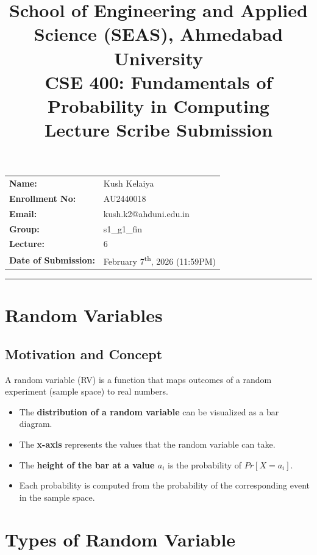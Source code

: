 \documentclass[11pt]{article}
\title{
	\normalsize School of Engineering and Applied Science (SEAS), Ahmedabad University \\
	\vspace{0.2cm}
	\textbf{CSE 400: Fundamentals of Probability in Computing}\\
	\Large Lecture Scribe Submission
}
\author{}
\date{}
\begin{document}
\maketitle

\vspace{-2cm}
\begin{center}
	\begin{tabular}{ll}
		\textbf{Name:} & {Kush Kelaiya \hspace{2.5in}} \\ [1.5ex]
		\textbf{Enrollment No:} & {AU2440018 \hspace{2.5in}} \\ [1.5ex]
		\textbf{Email:} & {kush.k2@ahduni.edu.in \hspace{2.1in}} \\ [1.5ex]
		\textbf{Group: } & s1\_g1\_fin \\ [1.5ex]
		\textbf{Lecture:} & 6 \\ [1.5ex]
		\textbf{Date of Submission:} & {February 7\textsuperscript{th}, 2026 (11:59PM) \hspace{1.2in}}
	\end{tabular}
\end{center}

\hrule
\vspace{0.5cm}

\section{Random Variables}
\subsection{Motivation and Concept}
A random variable (RV) is a function that maps outcomes of a random experiment (sample space) to real numbers.

\begin{itemize}
	\item The \textbf{distribution of a random variable} can be visualized as a bar diagram.
	\item The \textbf{x-axis} represents the values that the random variable can take.
	\item The \textbf{height of the bar at a value $a_i$} is the probability of $Pr\left[ X=a_i \right]$.
	\item Each probability is computed from the probability of the corresponding event in the sample space.
\end{itemize}

\section{Types of Random Variable}
\end{document}

